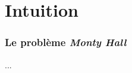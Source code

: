 \documentclass{beamer}
\begin{document}

\section{Intuition}

\begin{frame}
    \frametitle{Le problème \emph{Monty Hall}}
    ...
\end{frame}


\begin{frame}
    \begin{figure}
      \centering
      \scalebox{0.60}{}
    \end{figure}
\end{frame}

\begin{frame}
    \begin{figure}
      \centering
      \scalebox{0.60}{}
    \end{figure}
\end{frame}


\end{document}
